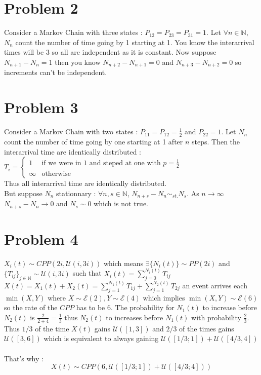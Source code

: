 \documentclass{article}
\begin{document}
\section*{Problem 2}
Consider a Markov Chain with three states : $P_{12}=P_{23}=P_{31}=1$. Let $\forall n\in\mathbb{N}$, $N_n$ count the number of time going by 1 starting at 1. You know the interarrival times will be 3 so all are independent as it is constant. Now suppose $N_{n+1}-N_n = 1$ then you know $N_{n+2}-N_{n+1} = 0$ and $N_{n+3}-N_{n+2} = 0$ so increments can't be independent.
\section*{Problem 3}
Consider a Markov Chain with two states : $P_{11} = P_{12}= \frac{1}{2}$ and $P_{22} = 1$. Let $N_n$ count the number of time going by one starting at 1 after $n$ steps. Then the interarrival time are identically distributed : 
$T_i = \left\{\begin{array}{ll}
    1 & \text{if we were in 1 and steped at one with } p=\frac{1}{2}\\
    \infty & \text{otherwise}
\end{array}\right.$ \\
Thus all interarrival time are identically distributed.
\\
But suppose $N_n$ stationnary : $\forall n,s \in \mathbb{N}$, $N_{n+s}-N_n \sim_{st.}N_s$. As $n\to \infty$ $N_{n+s}-N_n \to 0$ and $N_s \sim 0$ which is not true.
\section*{Problem 4}
${X_i(t)}\sim CPP(2i, \mathcal{U}(i,3i))$ which means $\exists \{N_i(t)\}\sim PP(2i)$ and $\{T_{ij}\}_{j\in \mathbb{N}}\sim \mathcal{U}(i,3i)$ such that $X_i(t) = \sum\limits_{j=0}^{N_i(t)}T_{ij}$\\
$X(t)=X_1(t)+X_2(t) = \sum\limits_{j=1}^{N_1(t)}T_{1j}+\sum\limits_{j=1}^{N_2(t)}T_{2j}$ an event arrives each $\min(X,Y)$ where $X\sim\mathcal{E}(2),Y\sim\mathcal{E}(4)$ which implies $\min(X,Y)\sim\mathcal{E}(6)$ so the rate of the $CPP$ has to be 6.
The probability for $N_1(t)$ to increase before $N_2(t)$ is $\frac{2}{2+4} = \frac{1}{3}$ thus $N_2(t)$ to increases before $N_1(t)$ with probability $\frac{2}{3}$. Thus $1/3$ of the time $X(t)$ gains $\mathcal{U}([1,3])$ and $2/3$ of the times gains $\mathcal{U}([3,6])$ which is equivalent to always gaining $\mathcal{U}([1/3;1])+\mathcal{U}([4/3,4])$
\\\\
That's why : $$\boxed{X(t)\sim CPP(6, \mathcal{U}([1/3;1])+\mathcal{U}([4/3;4]))}$$
\end{document}
